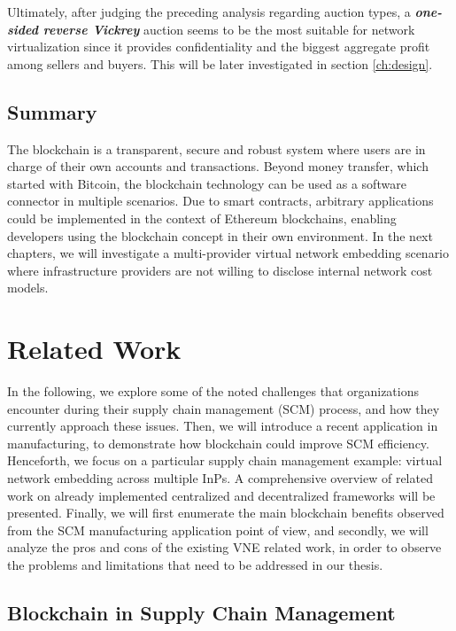 Ultimately, after judging the preceding analysis regarding auction types, a \textbf{\textit{one-sided reverse Vickrey}} auction seems to be the most suitable for network virtualization since it provides confidentiality and the biggest aggregate profit among sellers and buyers. This will be later investigated in section \ref{ch:design}.

\section{Summary}

The blockchain is a transparent, secure and robust system where users are in charge of their own accounts and transactions. Beyond money transfer, which started with Bitcoin, the blockchain technology can be used as a software connector in multiple scenarios. Due to smart contracts, arbitrary applications could be implemented in the context of Ethereum blockchains, enabling developers using the blockchain concept in their own environment. In the next chapters, we will investigate a multi-provider virtual network embedding scenario where infrastructure providers are not willing to disclose internal network cost models.

\chapter{Related Work}
\label{ch:relatedwork}

In the following, we explore some of the noted challenges that organizations encounter during their supply chain management (SCM) process, and how they currently approach these issues. Then, we will introduce a recent application in manufacturing, to demonstrate how blockchain could improve SCM efficiency. Henceforth, we focus on a particular supply chain management example: virtual network embedding across multiple InPs. A comprehensive overview of related work on already implemented centralized and decentralized frameworks will be presented. Finally, we will first enumerate the main blockchain benefits observed from the SCM manufacturing application point of view, and secondly, we will analyze the pros and cons of the existing VNE related work, in order to observe the problems and limitations that need to be addressed in our thesis.

\section{Blockchain in Supply Chain Management}

